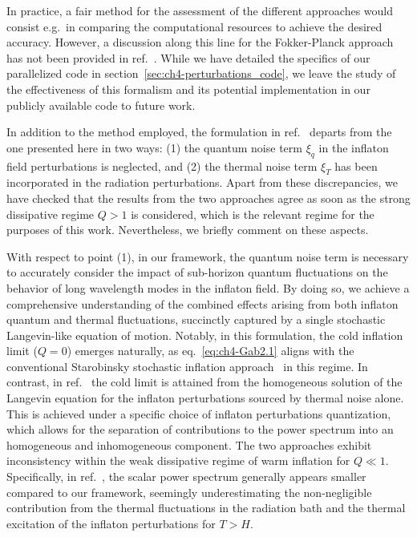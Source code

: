 In practice, a fair method for the assessment of the different approaches would consist e.g.\ in comparing the computational resources to achieve the desired accuracy. However, a discussion along this line for the Fokker-Planck approach has not been provided in ref.~\cite{Ballesteros:2023dno}. While we have detailed the specifics of our parallelized code in section~\ref{sec:ch4-perturbations_code}, we leave the study of the effectiveness of this formalism and its potential implementation in our publicly available code to future work.

In addition to the method employed, the formulation in ref.~\cite{Ballesteros:2023dno} departs from the one presented here in two ways: (1) the quantum noise term $\xi_q$ in the inflaton field perturbations is neglected, and (2) the thermal noise term $\xi_T$ has been incorporated in the radiation perturbations. Apart from these discrepancies, we have checked that the results from the two approaches agree as soon as the strong dissipative regime $Q > 1$ is considered, which is the relevant regime for the purposes of this work. Nevertheless, we briefly comment on these aspects.

With respect to point (1), in our framework, the quantum noise term  is necessary to accurately consider the impact of sub-horizon quantum fluctuations on the behavior of long wavelength modes in the inflaton field. By doing so, we achieve a comprehensive understanding of the combined effects arising from both inflaton quantum and thermal fluctuations, succinctly captured by a single stochastic Langevin-like equation of motion. Notably, in this formulation, the cold inflation limit ($Q=0$) emerges naturally, as eq.~\eqref{eq:ch4-Gab2.1} aligns with the conventional Starobinsky stochastic inflation approach~\cite{Starobinsky:1986fx} in this regime. In contrast, in ref.~\cite{Ballesteros:2023dno} the cold limit is attained from the homogeneous solution of the Langevin equation for the inflaton perturbations sourced by thermal noise alone. This is achieved under a specific choice of inflaton perturbations quantization, which allows for the separation of contributions to the power spectrum into an homogeneous and inhomogeneous component.  The two approaches exhibit inconsistency within the weak dissipative regime of warm inflation for $Q\ll 1$. Specifically, in ref.~\cite{Ballesteros:2023dno}, the scalar power spectrum generally appears smaller compared to our framework, seemingly underestimating the non-negligible contribution from the thermal fluctuations in the radiation bath and the thermal excitation of the inflaton perturbations for $T>H$.

